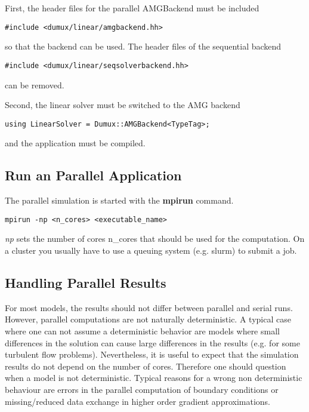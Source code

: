 First, the header files for the parallel AMGBackend must be included

\begin{lstlisting}[style=DumuxCode]
#include <dumux/linear/amgbackend.hh>
\end{lstlisting}

so that the backend can be used. The header files of the sequential backend

\begin{lstlisting}[style=DumuxCode]
#include <dumux/linear/seqsolverbackend.hh>
\end{lstlisting}
can be removed.

Second, the linear solver must be switched to the AMG backend 

\begin{lstlisting}[style=DumuxCode]
using LinearSolver = Dumux::AMGBackend<TypeTag>;
\end{lstlisting}

and the application must be compiled. 

\subsection{Run an Parallel Application}
The parallel simulation is started with the \textbf{mpirun} command.

\begin{lstlisting}[style=Bash]
mpirun -np <n_cores> <executable_name>
\end{lstlisting}

\textit{np} sets the number of cores {n\_cores} that should be used for the 
computation. On a cluster you usually have to use a queuing system (e.g. slurm) to 
submit a job. 

\subsection{Handling Parallel Results}
For most models, the results should not differ between parallel and serial 
runs. However, parallel computations are not naturally deterministic. 
A typical case where one can not assume a deterministic behavior are models where
small differences in the solution can cause large differences in the results 
(e.g. for some turbulent flow problems). Nevertheless, it is useful to expect that
the simulation results do not depend on the number of cores. Therefore one should question
when a model is not deterministic. Typical reasons for a wrong non deterministic
behaviour are errors in the parallel computation of boundary conditions or missing/reduced
data exchange in higher order gradient approximations. 


